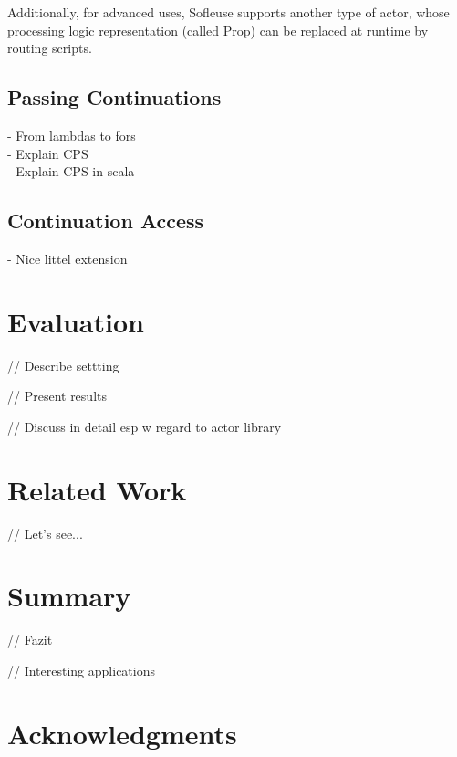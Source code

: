 \documentclass{sig-alternate}
\begin{document}
Additionally, for advanced uses, Sofleuse supports another type of actor, whose processing logic
representation (called Prop) can be replaced at runtime by routing scripts.


\subsection{Passing Continuations}

- From lambdas to fors\\
- Explain CPS\\
- Explain CPS in scala\\
                                                                           
\subsection{Continuation Access}

- Nice littel extension\\

\section{Evaluation}

// Describe settting

// Present results

// Discuss in detail esp w regard to actor library


\section{Related Work}

// Let's see...

\section{Summary}
                  
// Fazit

// Interesting applications

\section{Acknowledgments}


%  
\end{document}
